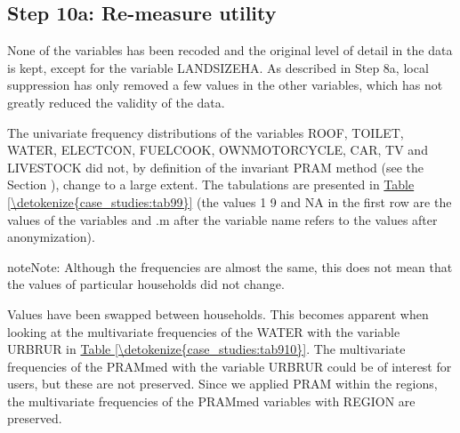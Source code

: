 \documentclass[letterpaper,10pt,english]{sphinxmanual}
\begin{document}
\subsection{Step 10a: Re-measure utility}
\label{\detokenize{case_studies:step-10a-re-measure-utility}}
None of the variables has been recoded and the original level of detail
in the data is kept, except for the variable LANDSIZEHA. As described in
Step 8a, local suppression has only removed a few values in the other
variables, which has not greatly reduced the validity of the data.

The univariate frequency distributions of the variables ROOF, TOILET,
WATER, ELECTCON, FUELCOOK, OWNMOTORCYCLE, CAR, TV and LIVESTOCK did not,
by definition of the invariant PRAM method (see the Section
), change
to a large extent. The tabulations are presented in \hyperref[\detokenize{case_studies:tab99}]{Table \ref{\detokenize{case_studies:tab99}}} (the
values 1 \textendash{} 9 and NA in the first row are the values of the variables and
.m after the variable name refers to the values after anonymization).

\begin{sphinxadmonition}{note}{Note:}
Although the frequencies are almost the same, this does not mean
that the values of particular households did not change.
\end{sphinxadmonition}

Values have been swapped between households. This becomes apparent when looking at
the multivariate frequencies of the WATER with the variable URBRUR in
\hyperref[\detokenize{case_studies:tab910}]{Table \ref{\detokenize{case_studies:tab910}}}. The multivariate frequencies of the PRAMmed with the
variable URBRUR could be of interest for users, but these are not
preserved. Since we applied PRAM within the regions, the multivariate
frequencies of the PRAMmed variables with REGION are preserved.
\end{document}
